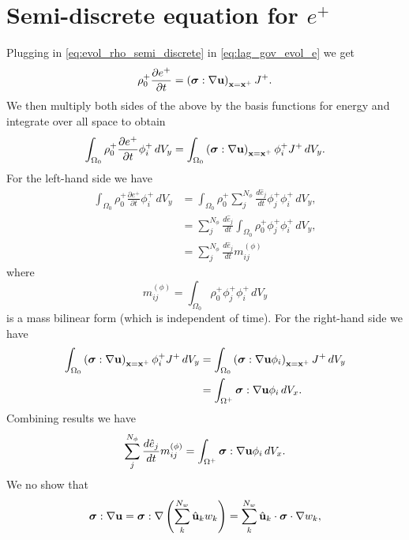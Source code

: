 \documentclass[11pt]{article}
\begin{document}
\section{Semi-discrete equation for $e^+$}
Plugging in \cref{eq:evol_rho_semi_discrete} in \cref{eq:lag_gov_evol_e} we get
\begin{equation}
    \rho^+_0 \frac{\partial e^+}{\partial t} = \left ( \bm \sigma : \nabla \mathbf{u} \right )_{\mathbf{x} = \mathbf{x}^+} J^+.
\end{equation}
We then multiply both sides of the above by the basis functions for energy and integrate over all space to obtain
\begin{equation}
    \int_{\Omega_0} \rho^+_0 \frac{\partial e^+}{\partial t} \phi_i^+ \, dV_y = \int_{\Omega_0} \left ( \bm \sigma : \nabla \mathbf{u} \right )_{\mathbf{x} = \mathbf{x}^+} \phi_i^+ J^+ \, dV_y.
\end{equation}
For the left-hand side we have
\begin{align}
    \int_{\Omega_0} \rho^+_0 \frac{\partial e^+}{\partial t} \phi_i^+ \, dV_y &= \int_{\Omega_0} \rho^+_0 \sum_j^{N_\phi} \frac{d \hat{e}_j}{dt} \phi_j^+ \phi_i^+ \, dV_y , \nonumber \\
    &= \sum_j^{N_\phi} \frac{d \hat{e}_j}{dt} \int_{\Omega_0} \rho^+_0 \phi_j^+ \phi_i^+ \, dV_y , \nonumber \\
    &= \sum_j^{N_\phi} \frac{d \hat{e}_j}{dt} m_{ij}^{(\phi)}
\end{align}
where
\begin{equation}
    m_{ij}^{(\phi)} = \int_{\Omega_0} \rho^+_0 \phi_j^+ \phi_i^+ \, dV_y
\end{equation}
is a mass bilinear form (which is independent of time). For the right-hand side we have
\begin{align}
    \int_{\Omega_0} \left ( \bm \sigma : \nabla \mathbf{u} \right )_{\mathbf{x} = \mathbf{x}^+} \phi_i^+ J^+ \, dV_y &= \int_{\Omega_0} \left ( \bm \sigma : \nabla \mathbf{u} \phi_i \right )_{\mathbf{x} = \mathbf{x}^+} J^+ \, dV_y \nonumber \\
    &= \int_{\Omega^+} \bm \sigma : \nabla \mathbf{u} \phi_i \, dV_x. 
\end{align}
Combining results we have
\begin{equation}
    \sum_j^{N_\phi} \frac{d \hat{e}_j}{dt} m_{ij}^{(\phi)} = \int_{\Omega^+} \bm \sigma : \nabla \mathbf{u} \phi_i \, dV_x.
\end{equation}
We no show that
\begin{equation}
    \bm \sigma : \nabla \mathbf{u} = \bm \sigma : \nabla \left ( \sum_k^{N_w} \hat{\mathbf{u}}_k w_k \right ) = \sum_k^{N_w} \hat{\mathbf{u}}_k \cdot \bm \sigma \cdot \nabla w_k,
\end{equation}
\end{document}
